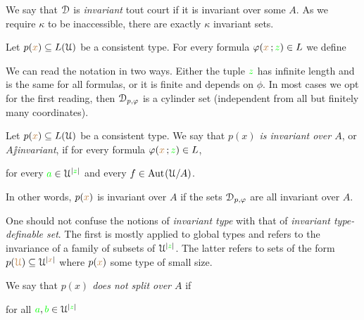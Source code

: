 \documentclass[creche.tex]{subfiles}
\begin{document}
We say that $\EuScript D$ is \emph{invariant\/} tout court if it is invariant over some $A$. As we require $\kappa$ to be inaccessible, there are exactly $\kappa$ invariant sets.

% 



Let $p({\color{brown} x})\subseteq L(\EuScript U)$ be a consistent type. For every formula $\varphi({\color{brown} x}\,;{\color{green} z})\in L$ we define


We can read the notation in two ways. Either the tuple ${\color{green} z}$ has infinite length and is the same for all formulas, or it is finite and depends on $\phi$. In most cases we opt for the first reading, then $\EuScript D_{p,\varphi}$ is a cylinder set (independent from all but finitely many coordinates).

Let $p({\color{brown} x})\subseteq L(\EuScript U)$ be a consistent type. We say that \emph{$p(x)$ is invariant over $A$}, or \emph{$A\jj$invariant}, if for every formula $\varphi({\color{brown} x}\,;{\color{green} z})\in L$, 

\hfill for every ${\color{green} a}\in\EuScript U^{|{\color{green} z}|}$ and every $f\in\textrm{Aut\kern.15ex}(\EuScript U/A)$.

In other words, $p({\color{brown} x})$ is invariant over $A$ if the sets $\EuScript D_{p,\varphi}$ are all invariant over $A$. 

One should not confuse the notions of \textit{invariant type\/} with that of \textit{invariant type-definable set}. The first is mostly applied to global types and refers to the invariance of a family of subsets of $\EuScript U^{|{\color{green} z}|}$. The latter refers to sets of the form $p({\color{brown}\EuScript U})\subseteq\EuScript U^{|{\color{brown} x}|}$ where $p({\color{brown} x})$ some type of small size.

We say that \emph{$p(x)$ does not split over $A$\/} if

\hfill for all ${\color{green} a},{\color{green} b}\in\EuScript U^{|{\color{green} z}|}$
\end{document}
